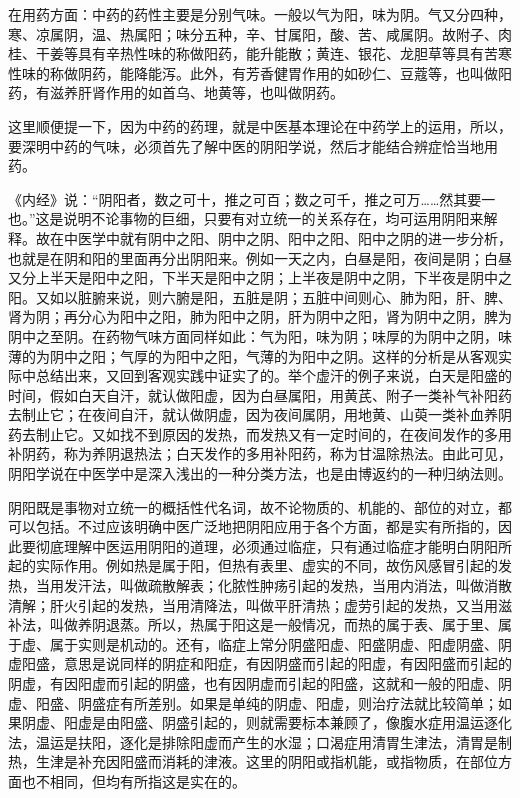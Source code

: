 \documentclass[a4paper,12pt,UTF8,twoside]{ctexbook}
\begin{document}
在用药方面：中药的药性主要是分别气味。一般以气为阳，味为阴。气又分四种，寒、凉属阴，温、热属阳；味分五种，辛、甘属阳，酸、苦、咸属阴。故附子、肉桂、干姜等具有辛热性味的称做阳药，能升能散；黄连、银花、龙胆草等具有苦寒性味的称做阴药，能降能泻。此外，有芳香健胃作用的如砂仁、豆蔻等，也叫做阳药，有滋养肝肾作用的如首乌、地黄等，也叫做阴药。

这里顺便提一下，因为中药的药理，就是中医基本理论在中药学上的运用，所以，要深明中药的气味，必须首先了解中医的阴阳学说，然后才能结合辨症恰当地用药。

《内经》说：“阴阳者，数之可十，推之可百；数之可千，推之可万……然其要一也。”这是说明不论事物的巨细，只要有对立统一的关系存在，均可运用阴阳来解释。故在中医学中就有阴中之阳、阴中之阴、阳中之阳、阳中之阴的进一步分析，也就是在阴和阳的里面再分出阴阳来。例如一天之内，白昼是阳，夜间是阴；白昼又分上半天是阳中之阳，下半天是阳中之阴；上半夜是阴中之阴，下半夜是阴中之阳。又如以脏腑来说，则六腑是阳，五脏是阴；五脏中间则心、肺为阳，肝、脾、肾为阴；再分心为阳中之阳，肺为阳中之阴，肝为阴中之阳，肾为阴中之阴，脾为阴中之至阴。在药物气味方面同样如此：气为阳，味为阴；味厚的为阴中之阴，味薄的为阴中之阳；气厚的为阳中之阳，气薄的为阳中之阴。这样的分析是从客观实际中总结出来，又回到客观实践中证实了的。举个虚汗的例子来说，白天是阳盛的时间，假如白天自汗，就认做阳虚，因为白昼属阳，用黄芪、附子一类补气补阳药去制止它；在夜间自汗，就认做阴虚，因为夜间属阴，用地黄、山萸一类补血养阴药去制止它。又如找不到原因的发热，而发热又有一定时间的，在夜间发作的多用补阴药，称为养阴退热法；白天发作的多用补阳药，称为甘温除热法。由此可见，阴阳学说在中医学中是深入浅出的一种分类方法，也是由博返约的一种归纳法则。

阴阳既是事物对立统一的概括性代名词，故不论物质的、机能的、部位的对立，都可以包括。不过应该明确中医广泛地把阴阳应用于各个方面，都是实有所指的，因此要彻底理解中医运用阴阳的道理，必须通过临症，只有通过临症才能明白阴阳所起的实际作用。例如热是属于阳，但热有表里、虚实的不同，故伤风感冒引起的发热，当用发汗法，叫做疏散解表；化脓性肿疡引起的发热，当用内消法，叫做消散清解；肝火引起的发热，当用清降法，叫做平肝清热；虚劳引起的发热，又当用滋补法，叫做养阴退蒸。所以，热属于阳这是一般情况，而热的属于表、属于里、属于虚、属于实则是机动的。还有，临症上常分阴盛阳虚、阳盛阴虚、阳虚阴盛、阴虚阳盛，意思是说同样的阴症和阳症，有因阴盛而引起的阳虚，有因阳盛而引起的阴虚，有因阳虚而引起的阴盛，也有因阴虚而引起的阳盛，这就和一般的阳虚、阴虚、阳盛、阴盛症有所差别。如果是单纯的阴虚、阳虚，则治疗法就比较简单；如果阴虚、阳虚是由阳盛、阴盛引起的，则就需要标本兼顾了，像腹水症用温运逐化法，温运是扶阳，逐化是排除阳虚而产生的水湿；口渴症用清胃生津法，清胃是制热，生津是补充因阳盛而消耗的津液。这里的阴阳或指机能，或指物质，在部位方面也不相同，但均有所指这是实在的。
\end{document}
